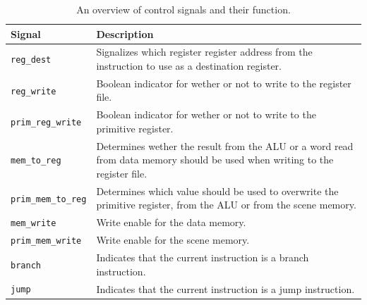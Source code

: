 \begin{table}
    \centering
    \begin{tabular}{|p{5cm}|p{7cm}|}
        \hline
        Signal             & Description                                                                                                                 \\ \hline
        \texttt{reg\_dest}          & Signalizes which register register address from the instruction to use as a destination register.                           \\ \hline
        \texttt{reg\_write}         & Boolean indicator for wether or not to write to the register file.                                                          \\ \hline
        \texttt{prim\_reg\_write}   & Boolean indicator for wether or not to write to the primitive register.                                                     \\ \hline
        \texttt{mem\_to\_reg}       & Determines wether the result from the ALU or a word read from data memory should be used when writing to the register file. \\ \hline
        \texttt{prim\_mem\_to\_reg} & Determines which value should be used to overwrite the primitive register, from the ALU or from the scene memory.           \\ \hline
        \texttt{mem\_write}         & Write enable for the data memory.                                                                                           \\ \hline
        \texttt{prim\_mem\_write}   & Write enable for the scene memory.                                                                                          \\ \hline
        \texttt{branch}             & Indicates that the current instruction is a branch instruction.                                                             \\ \hline
        \texttt{jump}               & Indicates that the current instruction is a jump instruction.                                                               \\ \hline
    \end{tabular}
    \caption{An overview of control signals and their function.}
    \label{tbl:control-signals}
\end{table}
